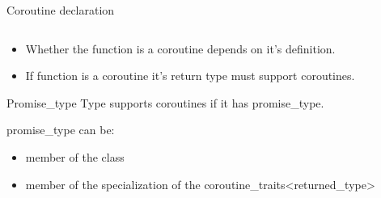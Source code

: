 \documentclass[10pt]{beamer}
\begin{document}
\begin{frame}{Coroutine declaration}
  \vfill
  \begin{center}
  \begin{minipage}{0.8\linewidth}
  \inputminted{c++}{code-examples/intro/declaration.hpp}
  \end{minipage}
  \end{center}
  \vfill

  \pause

  \begin{itemize}[<+->]
  	\item Whether the function is a coroutine depends on \alert{it's definition}.
  	\item If function is a coroutine it's \alert{return type must support coroutines}.
  \end{itemize}
  
\end{frame}

\begin{frame}{Promise\_type}
	Type supports coroutines \alert{if it has promise\_type}.
	\vfill

	promise\_type can be:
	\begin{itemize}
		\item member of the class
		\item member of the specialization of the coroutine\_traits<returned\_type>
	\end{itemize}
\end{frame}
\end{document}
